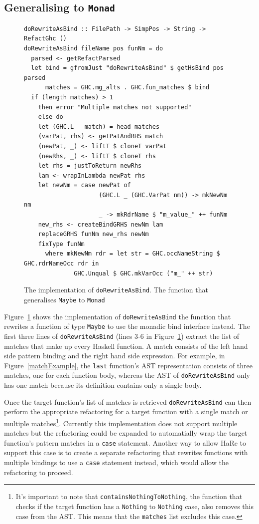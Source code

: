 \subsection{Generalising to \texttt{Monad}}

\begin{figure}[t]
\begin{lstlisting}
doRewriteAsBind :: FilePath -> SimpPos -> String -> RefactGhc ()
doRewriteAsBind fileName pos funNm = do
  parsed <- getRefactParsed
  let bind = gfromJust "doRewriteAsBind" $ getHsBind pos parsed
      matches = GHC.mg_alts . GHC.fun_matches $ bind
  if (length matches) > 1
    then error "Multiple matches not supported"
    else do
    let (GHC.L _ match) = head matches
    (varPat, rhs) <- getPatAndRHS match
    (newPat, _) <- liftT $ cloneT varPat
    (newRhs, _) <- liftT $ cloneT rhs
    let rhs = justToReturn newRhs
    lam <- wrapInLambda newPat rhs
    let newNm = case newPat of
                     (GHC.L _ (GHC.VarPat nm)) -> mkNewNm nm
                     _ -> mkRdrName $ "m_value_" ++ funNm
    new_rhs <- createBindGRHS newNm lam
    replaceGRHS funNm new_rhs newNm
    fixType funNm
      where mkNewNm rdr = let str = GHC.occNameString $ GHC.rdrNameOcc rdr in
              GHC.Unqual $ GHC.mkVarOcc ("m_" ++ str)
\end{lstlisting}
\caption{The implementation of \texttt{doRewriteAsBind}. The function that generalises \texttt{Maybe} to \texttt{Monad}}
\label{doRewriteAsBind}
\end{figure}

Figure~\ref{doRewriteAsBind} shows the implementation of \texttt{doRewriteAsBind} the function that rewrites a function of type \texttt{Maybe} to use the monadic bind interface instead. The first three lines of \texttt{doRewriteAsBind} (lines 3-6 in Figure~\ref{doRewriteAsBind}) extract the list of matches that make up every Haskell function. A match consists of the left hand side pattern binding and the right hand side expression. For example, in Figure~\ref{matchExample}, the \texttt{last} function's AST representation consists of three matches, one for each function body, whereas the AST of \texttt{doRewriteAsBind} only has one match because its definition contains only a single body.

Once the target function's list of matches is retrieved \texttt{doRewriteAsBind} can then perform the appropriate refactoring for a target function with a single match or multiple matches\footnote{It's important to note that \texttt{containsNothingToNothing}, the function that checks if the target function has a \texttt{Nothing} to \texttt{Nothing} case, also removes this case from the AST. This means that the \texttt{matches} list excludes this case.}. Currently this implementation does not support multiple matches but the refactoring could be expanded to automatially wrap the target function's pattern matches in a \texttt{case} statement. Another way to allow HaRe to support this case is to create a separate refactoring that rewrites functions with multiple bindings to use a \texttt{case} statement instead, which would allow the refactoring to proceed.

